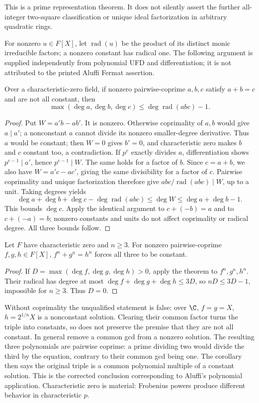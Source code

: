 This is a prime representation theorem. It does not silently
assert the further all-integer two-square classification or
unique ideal factorization in arbitrary quadratic rings.

For nonzero $u\in F[X]$, let $\operatorname{rad}(u)$ be the
product of its distinct monic irreducible factors; a nonzero
constant has radical one. The following argument is supplied
independently from polynomial UFD and differentiation; it is
not attributed to the printed Aluffi Fermat assertion.
\begin{theorem}\label{thm:mason-stothers}
Over a characteristic-zero field, if nonzero pairwise-coprime
$a,b,c$ satisfy $a+b=c$ and are not all constant, then
\[
 \max(\deg a,\deg b,\deg c)\le
 \deg\operatorname{rad}(abc)-1.
\]
\end{theorem}
\begin{proof}
Put $W=a'b-ab'$. It is nonzero. Otherwise coprimality of $a,b$
would give $a\mid a'$; a nonconstant $a$ cannot divide its
nonzero smaller-degree derivative. Thus $a$ would be constant;
then $W=0$ gives $b'=0$, and characteristic zero makes $b$
and $c$ constant too, a contradiction.
If $p^e$ exactly divides $a$, differentiation shows
$p^{e-1}\mid a'$, hence $p^{e-1}\mid W$.
The same holds for a factor of $b$.
Since $c=a+b$, we also have $W=a'c-ac'$, giving the same
divisibility for a factor of $c$. Pairwise coprimality and
unique factorization therefore give
$abc/\operatorname{rad}(abc)\mid W$, up to a unit.
Taking degrees yields
\[
 \deg a+\deg b+\deg c-\deg\operatorname{rad}(abc)
 \le\deg W\le\deg a+\deg b-1.
\]
This bounds $\deg c$. Apply the identical argument to
$c+(-b)=a$ and to $c+(-a)=b$; nonzero constants and units
do not affect coprimality or radical degree. All three bounds
follow.
\end{proof}

\begin{corollary}\label{cor:primitive-polynomial-fermat}
Let $F$ have characteristic zero and $n\ge3$.
For nonzero pairwise-coprime $f,g,h\in F[X]$,
$f^n+g^n=h^n$ forces all three to be constant.
\end{corollary}
\begin{proof}
If $D=\max(\deg f,\deg g,\deg h)>0$, apply the theorem to
$f^n,g^n,h^n$. Their radical has degree at most
$\deg f+\deg g+\deg h\le3D$, so $nD\le3D-1$, impossible
for $n\ge3$. Thus $D=0$.
\end{proof}
Without coprimality the unqualified statement is false:
over $\C$, $f=g=X$, $h=2^{1/n}X$ is a nonconstant solution.
Clearing their common factor turns the triple into constants,
so does not preserve the premise that they are not all constant.
In general remove a common gcd from a nonzero solution.
The resulting three polynomials are pairwise coprime: a prime
dividing two would divide the third by the equation, contrary
to their common gcd being one. The corollary then says the
original triple is a common polynomial multiple of a constant
solution. This is the corrected conclusion corresponding to
Aluffi's polynomial application. Characteristic zero is material:
Frobenius powers produce different behavior in characteristic $p$.
